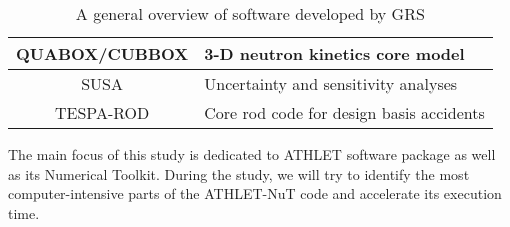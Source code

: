 \begin{table}[htb]
\begin{tabular}{|c|l|}
QUABOX/CUBBOX & 3-D neutron kinetics core model                                                                                                                                                              \\ \hline
SUSA          & Uncertainty and sensitivity analyses                                                                                                                                                         \\ \hline
TESPA-ROD     & Core rod code for design basis accidents                                                                                                                                                     \\ \hline
\end{tabular}
\caption{A general overview of software developed by GRS \cite{grs:grs-general-info}}
\label{table:introduction-grs-software}
\end{table}



The main focus of this study is dedicated to ATHLET software package as well as its Numerical Toolkit. During the study, we will try to identify the most computer-intensive parts of the ATHLET-NuT code and accelerate its execution time.\\


